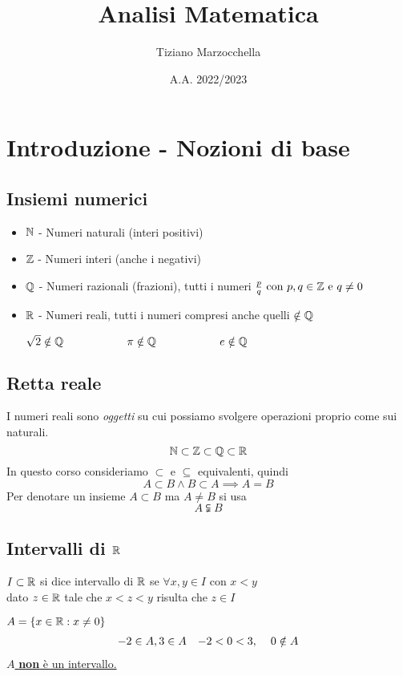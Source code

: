 \documentclass{article}
\title{Analisi Matematica}
\author{Tiziano Marzocchella}
\date{A.A. 2022/2023}
\begin{document}


\section{Introduzione - Nozioni di base}
\subsection{Insiemi numerici}
\begin{itemize}
    \item \(\mathbb{N}\) - Numeri naturali (interi positivi)
    \item \(\mathbb{Z}\) - Numeri interi (anche i negativi)
    \item \(\mathbb{Q}\) - Numeri razionali (frazioni), tutti i numeri \(\frac{p}{q} \text{ con } p, q \in \mathbb{Z} \text{ e } q \neq 0\)
    \item \(\mathbb{R}\) - Numeri reali, tutti i numeri compresi anche quelli \(\notin \mathbb{Q}\)
    \begin{eg}
    \(\sqrt{2} \notin \mathbb{Q} \hspace{2cm} \pi \notin \mathbb{Q} \hspace{2cm} e \notin \mathbb{Q}\)
    \end{eg}
\end{itemize}

\subsection{Retta reale}
I numeri reali sono \emph{oggetti} su cui possiamo svolgere operazioni proprio come sui naturali.
\[\mathbb{N} \subset \mathbb{Z} \subset \mathbb{Q} \subset \mathbb{R}\]
In questo corso consideriamo \(\subset\) e \(\subseteq\) equivalenti, quindi
\[A \subset B \land B \subset A \implies A=B\]
Per denotare un insieme \(A \subset B\) ma \(A \neq B\) si usa
\[A \subsetneqq B\]

\subsection{Intervalli di \(\mathbb{R}\)}
\begin{dfn}
\(I \subset \mathbb{R}\) si dice intervallo di \(\mathbb{R}\) se \(\forall x, y \in I\) con \(x < y\)\\
dato \(z \in \mathbb{R}\) tale che \(x < z < y\) risulta che \(z \in I\)
\end{dfn}

\begin{eg}
\(A = \{ x \in \mathbb{R} : x \neq 0\}\)
\begin{align*}
    -2 \in A, 3 \in A && -2 < 0 < 3,\hspace{.4cm} 0 \notin A 
\end{align*}
\underline{\(A\) \textbf{non} è un intervallo.}
\end{eg}
\end{document}
